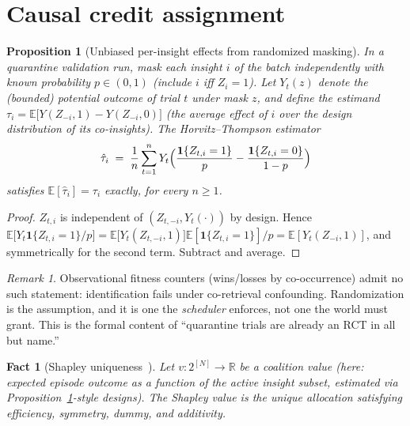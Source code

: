 \documentclass[11pt]{article}
\theoremstyle{plain}
\newtheorem{proposition}[theorem]{Proposition}
\newtheorem{fact}[theorem]{Fact} %
\theoremstyle{definition}
\theoremstyle{remark}
\newtheorem{remark}[theorem]{Remark}
\newcommand{\E}{\mathbb{E}}
\newcommand{\R}{\mathbb{R}}
\newcommand{\one}{\mathbf{1}}
\begin{document}
\section{Causal credit assignment}\label{sec:credit}

\begin{proposition}[Unbiased per-insight effects from randomized masking]
\label{prop:ipw}
In a quarantine validation run, mask each insight $i$ of the batch
independently with known probability $p \in (0,1)$ (include $i$ iff $Z_i =
1$). Let $Y_t(z)$ denote the (bounded) potential outcome of trial $t$ under
mask $z$, and define the estimand
$\tau_i = \E\bigl[ Y(Z_{-i}, 1) - Y(Z_{-i}, 0) \bigr]$
(the average effect of $i$ over the design distribution of its co-insights).
The Horvitz--Thompson estimator
\[
  \hat\tau_i \;=\; \frac1n \sum_{t=1}^n Y_t
  \Bigl( \frac{\one\{Z_{t,i}=1\}}{p} - \frac{\one\{Z_{t,i}=0\}}{1-p} \Bigr)
\]
satisfies $\E[\hat\tau_i] = \tau_i$ exactly, for every $n \ge 1$.
\end{proposition}

\begin{proof}
$Z_{t,i}$ is independent of $(Z_{t,-i}, Y_t(\cdot))$ by design. Hence
$\E\bigl[ Y_t \one\{Z_{t,i}=1\}/p \bigr]
 = \E\bigl[ Y_t(Z_{t,-i},1) \bigr] \E[\one\{Z_{t,i}=1\}]/p
 = \E[ Y_t(Z_{-i},1) ]$, and symmetrically for the second term. Subtract and
average.
\end{proof}

\begin{remark}
Observational fitness counters (wins/losses by co-occurrence) admit no such
statement: identification fails under co-retrieval confounding. Randomization
is the assumption, and it is one the \emph{scheduler} enforces, not one the
world must grant. This is the formal content of ``quarantine trials are
already an RCT in all but name.''
\end{remark}

\begin{fact}[Shapley uniqueness~\cite{shapley53}]\label{fact:shapley}
Let $v : 2^{[N]} \to \R$ be a coalition value (here: expected episode outcome
as a function of the active insight subset, estimated via
Proposition~\ref{prop:ipw}-style designs). The Shapley value is the unique
allocation satisfying efficiency, symmetry, dummy, and additivity.
\end{fact}
\end{document}
